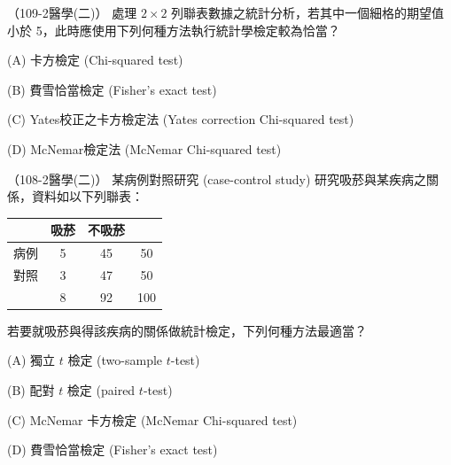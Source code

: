     \begin{docexam}{（109-2醫學(二)）}
        處理 $2 \times 2$ 列聯表數據之統計分析，若其中一個細格的期望值小於 5，此時應使用下列何種方法執行統計學檢定較為恰當？
        
        (A) 卡方檢定 (Chi-squared test)
        
        (B) 費雪恰當檢定 (Fisher's exact test)

        (C) Yates校正之卡方檢定法 (Yates correction Chi-squared test)
 
        (D) McNemar檢定法 (McNemar Chi-squared test)
    \end{docexam}
    
    \begin{docexam}{（108-2醫學(二)）}
        某病例對照研究 (case-control study) 研究吸菸與某疾病之關係，資料如以下列聯表：
        \begin{table}[htbp]
            \begin{center}
                \begin{tabular}{c|cc|c}
                    & 吸菸 & 不吸菸 & \\
                    \hline
                    病例 & 5 & 45 & 50\\
                    對照 & 3 & 47 & 50\\
                    \hline
                    & 8 & 92 & 100
                \end{tabular}
            \end{center}
        \end{table}
        
        \noindent 若要就吸菸與得該疾病的關係做統計檢定，下列何種方法最適當？
        
        (A) 獨立 $t$ 檢定 (two-sample $t$-test)
        
        (B) 配對 $t$ 檢定 (paired $t$-test)

        (C) McNemar 卡方檢定 (McNemar Chi-squared test)
 
        (D) 費雪恰當檢定 (Fisher's exact test)
    \end{docexam}